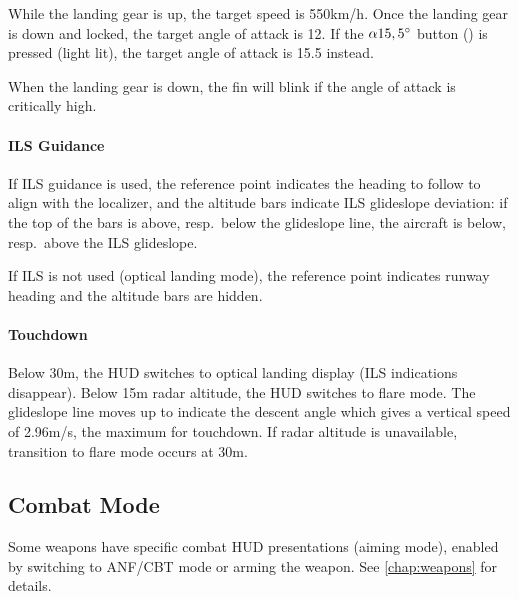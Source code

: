While the landing gear is up, the target speed is 550km/h.
Once the landing gear is down and locked, the target angle of attack is 12\textdegree{}.
If the $\alpha 15,5\degree$ button
() is pressed (light lit),
the target angle of attack is 15.5\textdegree{} instead.

When the landing gear is down, the fin will blink if the angle of attack is critically high.

\paragraph{ILS Guidance}
If ILS guidance is used, the reference point indicates the heading to follow to align with the localizer,
and the altitude bars indicate ILS glideslope deviation:
if the top of the bars is above, resp.\ below the glideslope line,
the aircraft is below, resp.\ above the ILS glideslope.

If ILS is not used (optical landing mode),
the reference point indicates runway heading and the altitude bars are hidden.

\paragraph{Touchdown}
Below 30m, the HUD switches to optical landing display (ILS indications disappear).
Below 15m radar altitude, the HUD switches to flare mode.
The glideslope line moves up to indicate the descent angle
which gives a vertical speed of 2.96m/s, the maximum for touchdown.
If radar altitude is unavailable, transition to flare mode occurs at 30m.


\subsection{Combat Mode}
Some weapons have specific combat HUD presentations (aiming mode),
enabled by switching to ANF/CBT mode or arming the weapon.
See \cref{chap:weapons} for details.
